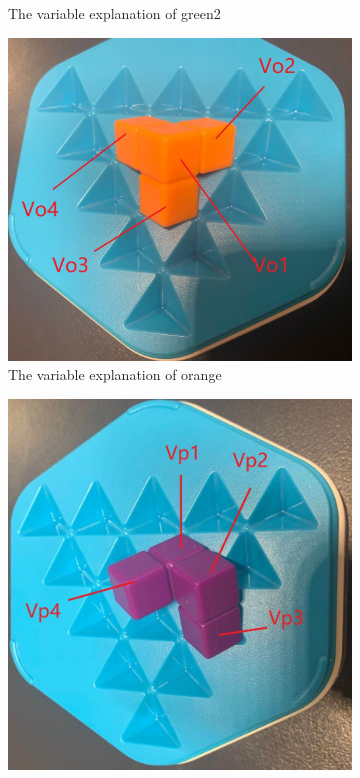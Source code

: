 \begin{figure}[htbp]
\begin{subfigure}[b]{.24\textwidth}
\caption{The variable explanation of green2}
  \label{fig:3Dgreen2}
\end{subfigure}
\begin{subfigure}[b]{.24\textwidth}
\centering
\includegraphics[width=\textwidth]{figs/3Dorange.jpg}
\caption{The variable explanation of orange}
  \label{fig:3Dorange}
\end{subfigure}
\begin{subfigure}[b]{.24\textwidth}
\centering
\includegraphics[width=\textwidth]{figs/3Dpurple.jpg}

\end{subfigure}
\end{figure}
